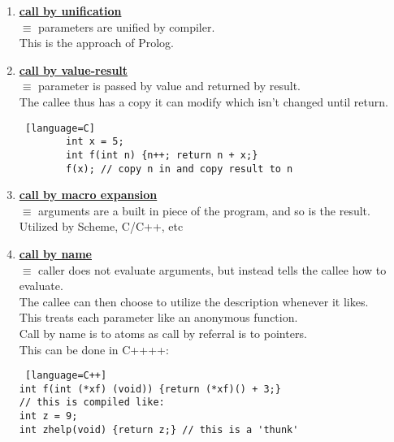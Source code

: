 \documentclass[../../lecture_notes.tex]{subfiles}
\begin{document}
\begin{enumerate} [itemsep=0mm]
		$\equiv$ caller tells callee where the result should go, and the result is copied there\\
		This lets a function return a varying result.\\
		This lets functions communicate in the opposite direction as call by value.\\
		The variable is instantiated on call and initialized on return.\\
		This is commonly used in ‘Ada’, but is used in C as well:
		\begin{lstlisting} [language=C]
<unistd.h>
  ssize_t read(int filedes, void *buf, size_t nbyte);
  // buf is really a call by result!
		\end{lstlisting}
	\item \textbf{\underline{call by unification}}\\
		$\equiv$ parameters are unified by compiler.\\
		This is the approach of Prolog.
	\item \textbf{\underline{call by value-result}}\\
		$\equiv$ parameter is passed by value and returned by result.\\
		The callee thus has a copy it can modify which isn’t changed until return.
		\begin{lstlisting} [language=C]
		int x = 5;
		int f(int n) {n++; return n + x;}
		f(x); // copy n in and copy result to n
		\end{lstlisting}
	\item \textbf{\underline{call by macro expansion}}\\
		$\equiv$ arguments are a built in piece of the program, and so is the result.\\
		Utilized by Scheme, C/C++, etc
	\item \textbf{\underline{call by name}}\\
		$\equiv$ caller does not evaluate arguments, but instead tells the callee how to evaluate.\\
		The callee can then choose to utilize the description whenever it likes.\\
		This treats each parameter like an anonymous function.\\
		Call by name is to atoms as call by referral is to pointers.\\
		This can be done in C++++:
		\begin{lstlisting} [language=C++]
int f(int (*xf) (void)) {return (*xf)() + 3;}
// this is compiled like:
int z = 9;
int zhelp(void) {return z;} // this is a 'thunk'

\end{lstlisting}
\end{enumerate}
\end{document}

